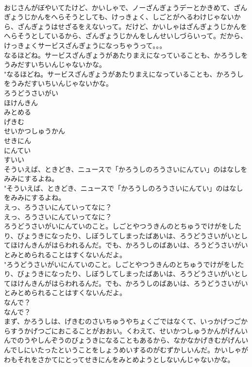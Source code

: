 \documentclass[8pt]{extreport}
\begin{document}
\begin{CJK}{UTF8}{min}
\\	おじさんがぼやいてたけど、かいしゃで、ノーざんぎょうデーとかきめて、ざんぎょうじかんをへらそうとしても、けっきょく、しごとがへるわけじゃないから、ざんぎょうはせざるをえないって。だけど、かいしゃはざんぎょうじかんをへらそうとしているから、ざんぎょうじかんをしんせいしづらいって。だから、けっきょくサービスざんぎょうになっちゃうって。。。 
\\	なるほどね。サービスざんぎょうがあたりまえになっていることも、かろうしをうみだすいちいんじゃないかな。	
\\	"なるほどね。サービスざんぎょうがあたりまえになっていることも、かろうしをうみだすいちいんじゃないかな。 
\\	ろうどうさいがい
\\	ほけんきん
\\	みとめる
\\	げきむ
\\	せいかつしゅうかん
\\	せきにん
\\	にんてい
\\	すいい
\\	そういえば、ときどき、ニュースで「かろうしのろうさいにんてい」のはなしをみみにするよね。	
\\	"そういえば、ときどき、ニュースで「かろうしのろうさいにんてい」のはなしをみみにするよね。 
\\	えっ、ろうさいにんていってなに？	
\\	えっ、ろうさいにんていってなに？ 
\\	ろうどうさいがいにんていのこと。しごとやつうきんのとちゅうでけがをしたり、びょうきになったり、しぼうしてしまったばあいは、ろうどうさいがいとしてほけんきんがはらわれるんだ。でも、かろうしのばあいは、ろうどうさいがいとみとめられることはすくないんだよ。	
\\	"ろうどうさいがいにんていのこと。しごとやつうきんのとちゅうでけがをしたり、びょうきになったり、しぼうしてしまったばあいは、ろうどうさいがいとしてほけんきんがはらわれるんだ。でも、かろうしのばあいは、ろうどうさいがいとみとめられることはすくないんだよ。 
\\	なんで？	
\\	なんで？ 
\\	まず、かろうしは、げきむのさいちゅうやちょくごではなくて、いっかげつごからすうかげつごにおこることがおおい。くわえて、せいかつしゅうかんがげんいんでのうやしんぞうのびょうきになることもあるから、なかなかげきむがげんいんでしにいたったということをしょうめいするのがむずかしいんだ。かいしゃがわもそれをさかてにとってせきにんをみとめようとしないんじゃないかな。	

\end{CJK}
\end{document}
